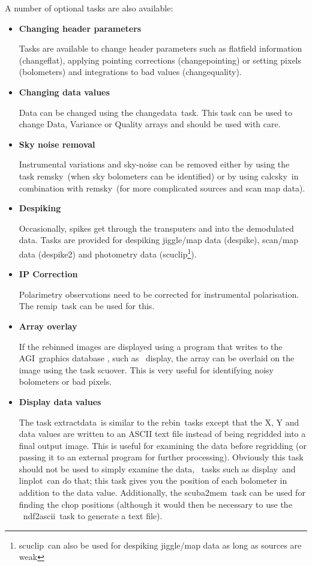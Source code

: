 \documentclass[twoside,11pt]{article}
\newcommand{\Kappa}{\xref{{\sc{Kappa}}}{sun95}{}}
\newcommand{\convert}{\xref{{\sc{Convert}}}{sun55}{}}
\newcommand{\agi}{\xref{AGI}{sun48}{}}
\newcommand{\task}[1]{{\sf #1}}
\newcommand{\rebin}{\htmlref{\task{rebin}}{REBIN}}
\newcommand{\calcsky}{\htmlref{\task{calcsky}}{CALCSKY}}
\newcommand{\chgqual}{\htmlref{\task{change\_quality}}{CHANGE_QUALITY}}
\newcommand{\chgflat}{\htmlref{\task{change\_flat}}{CHANGE_FLAT}}
\newcommand{\chgpnt}{\htmlref{\task{change\_pointing}}{CHANGE_POINTING}}
\newcommand{\chgdata}{\htmlref{\task{change\_data}}{CHANGE_DATA}}
\newcommand{\remsky}{\htmlref{\task{remsky}}{REMSKY}}
\newcommand{\scuover}{\htmlref{\task{scuover}}{SCUOVER}}
\newcommand{\extdata}{\htmlref{\task{extract\_data}}{EXTRACT_DATA}}
\newcommand{\despike}{\htmlref{\task{despike}}{DESPIKE}}
\newcommand{\despikeb}{\htmlref{\task{despike2}}{DESPIKE2}}
\newcommand{\scuclip}{\htmlref{\task{scuclip}}{SCUCLIP}}
\newcommand{\remip}{\htmlref{\task{remip}}{REMIP}}
\newcommand{\scubamem}{\htmlref{\task{scuba2mem}}{SCUBA2MEM}}
\newcommand{\display}{\xref{\task{display}}{sun95}{DISPLAY}}
\newcommand{\linplot}{\xref{\task{linplot}}{sun95}{LINPLOT}}
\newcommand{\ndftoascii}{\xref{\task{ndf2ascii}}{sun55}{NDF2ASCII}}
\newcommand{\htmlref}[2]{#1}
\newcommand{\xref}[3]{#1}
\renewcommand{\_}{\texttt{\symbol{95}}}
\begin{document}
A number of optional tasks are also available:
\begin{itemize}
\item {\bf Changing header parameters}

Tasks are available to change header parameters such as flatfield
information (\chgflat), applying pointing corrections
(\chgpnt) or setting pixels (bolometers) and integrations to bad
values (\chgqual). 

\item {\bf Changing data values}

Data can be changed using the \chgdata\ task. This task can be used to
change Data, Variance or Quality arrays and should be used with
care. 

\item {\bf Sky noise removal}

Instrumental variations and sky-noise can be removed either by using the task
\remsky\ (when sky bolometers can be identified) or by using \calcsky\ in
combination with \remsky\ (for more complicated sources and scan map data).

\item {\bf Despiking}

Occasionally, spikes get through the transputers and into the demodulated
data. Tasks are provided for despiking jiggle/map data (\despike),
scan/map data (\despikeb) and photometry data (\scuclip\footnote{\scuclip\
can also be used for despiking jiggle/map data as long as sources are weak}).


\item {\bf IP Correction}

Polarimetry observations need to be corrected for instrumental
polarisation. The \remip\ task can be used for this.

\item {\bf Array overlay}

If the rebinned images are displayed using a program that writes to the \agi\
graphics database \cite{agi}, such as \Kappa\ \display, the array can be
overlaid on the image using the task \scuover. This is very useful for
identifying noisy bolometers or bad pixels.

\item{\bf Display data values}

The task \extdata\ is similar to the \rebin\ tasks except that the 
X, Y and data values are written to an ASCII text file instead of 
being regridded into a final output image. This is useful for examining
the data before regridding (or passing it to an external program for
further processing). Obviously this task should not be used to simply
examine the data, \Kappa\ tasks such as \display\ and \linplot\
can do that; this task gives you the position of each bolometer in addition
to the data value. Additionally, the \scubamem\ task can be used  for finding
the chop positions (although it would then be necessary to use
the \convert\ \ndftoascii\ task to generate a text file).

\end{itemize}
\end{document}
